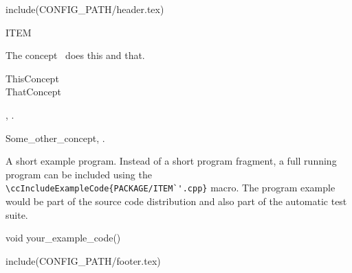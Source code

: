 include(CONFIG_PATH/header.tex)
\begin{ccRefConcept}{ITEM}


\ccDefinition
  
The concept \ccRefName\ does this and that.

\ccGeneralizes

ThisConcept \\
ThatConcept

\ccTypes


\ccCreation
{}  %


\ccOperations


\ccHasModels

,
.

\ccSeeAlso

Some\_other\_concept,
.

\ccExample

A short example program.
Instead of a short program fragment, a full running program can be
included using the 
\verb|\ccIncludeExampleCode{PACKAGE/ITEM`'.cpp}| 
macro. The program example would be part of the source code distribution and
also part of the automatic test suite.

\begin{ccExampleCode}
void your_example_code() {
}
\end{ccExampleCode}


\end{ccRefConcept}

include(CONFIG_PATH/footer.tex)
